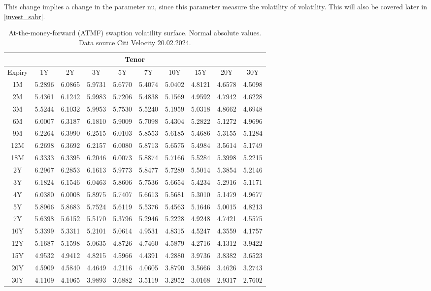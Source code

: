 This change implies a change in the parameter nu, since this parameter measure the volatility of volatility. 
This will also be covered later in \ref{invest_sabr}. 
\\
\begin{table}[H]
    \centering
    \begin{tabular}{|c|c|c|c|c|c|c|c|c|c|}
    \hline  
        \multicolumn{10}{|c|}{Tenor} \\ 
    \hline
     Expiry& 1Y & 2Y & 3Y & 5Y & 7Y & 10Y & 15Y & 20Y & 30Y \\
    \hline
    \rowcolor{lightgray!40} 1M & 5.2896 & 6.0865 & 5.9731 & 5.6770 & 5.4074 & 5.0402 & 4.8121 & 4.6578 & 4.5098 \\
    2M & 5.4361 & 6.1242 & 5.9983 & 5.7206 & 5.4838 & 5.1569 & 4.9592 & 4.7942 & 4.6228 \\
    \rowcolor{lightgray!40} 3M & 5.5244 & 6.1032 & 5.9953 & 5.7530 & 5.5240 & 5.1959 & 5.0318 & 4.8662 & 4.6948 \\
    6M & 6.0007 & 6.3187 & 6.1810 & 5.9009 & 5.7098 & 5.4304 & 5.2822 & 5.1272 & 4.9696 \\
    \rowcolor{lightgray!40} 9M & 6.2264 & 6.3990 & 6.2515 & 6.0103 & 5.8553 & 5.6185 & 5.4686 & 5.3155 & 5.1284 \\
    12M & 6.2698 & 6.3692 & 6.2157 & 6.0080 & 5.8713 & 5.6575 & 5.4984 & 3.5614 & 5.1749 \\
    \rowcolor{lightgray!40} 18M & 6.3333 & 6.3395 & 6.2046 & 6.0073 & 5.8874 & 5.7166 & 5.5284 & 5.3998 & 5.2215 \\
    2Y & 6.2967 & 6.2853 & 6.1613 & 5.9773 & 5.8477 & 5.7289 & 5.5014 & 5.3854 & 5.2146 \\
    \rowcolor{lightgray!40} 3Y & 6.1824 & 6.1546 & 6.0463 & 5.8606 & 5.7536 & 5.6654 & 5.4234 & 5.2916 & 5.1171 \\
    4Y & 6.0380 & 6.0008 & 5.8975 & 5.7407 & 5.6613 & 5.5681 & 5.3010 & 5.1479 & 4.9677 \\
    \rowcolor{lightgray!40} 5Y & 5.8966 & 5.8683 & 5.7524 & 5.6119 & 5.5376 & 5.4563 & 5.1646 & 5.0015 & 4.8213 \\
    7Y & 5.6398 & 5.6152 & 5.5170 & 5.3796 & 5.2946 & 5.2228 & 4.9248 & 4.7421 & 4.5575 \\
    \rowcolor{lightgray!40} 10Y & 5.3399 & 5.3311 & 5.2101 & 5.0614 & 4.9531 & 4.8315 & 4.5247 & 4.3559 & 4.1757 \\
    12Y & 5.1687 & 5.1598 & 5.0635 & 4.8726 & 4.7460 & 4.5879 & 4.2716 & 4.1312 & 3.9422 \\
    \rowcolor{lightgray!40} 15Y & 4.9532 & 4.9412 & 4.8215 & 4.5966 & 4.4391 & 4.2880 & 3.9736 & 3.8382 & 3.6523 \\
    20Y & 4.5909 & 4.5840 & 4.4649 & 4.2116 & 4.0605 & 3.8790 & 3.5666 & 3.4626 & 3.2743 \\
    \rowcolor{lightgray!40} 30Y & 4.1109 & 4.1065 & 3.9893 & 3.6882 & 3.5119 & 3.2952 & 3.0168 & 2.9317 & 2.7602 \\
    \hline
    \end{tabular}
    \caption{At-the-money-forward (ATMF) swaption volatility surface. Normal absolute values. Data source Citi Velocity 20.02.2024. }
    \label{tab:swaption_skew_ATMF}
\end{table}

